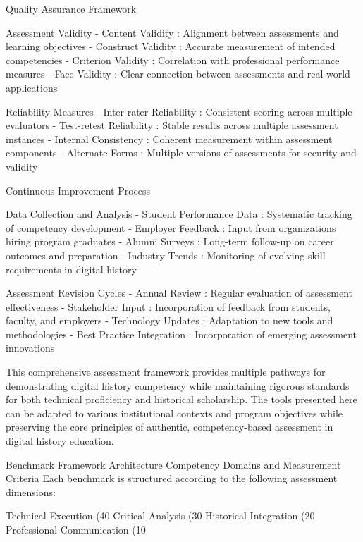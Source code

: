 \begin{appendices}
    Quality Assurance Framework

     Assessment Validity
-  Content Validity : Alignment between assessments and learning objectives
-  Construct Validity : Accurate measurement of intended competencies
-  Criterion Validity : Correlation with professional performance measures
-  Face Validity : Clear connection between assessments and real-world applications

     Reliability Measures
-  Inter-rater Reliability : Consistent scoring across multiple evaluators
-  Test-retest Reliability : Stable results across multiple assessment instances
-  Internal Consistency : Coherent measurement within assessment components
-  Alternate Forms : Multiple versions of assessments for security and validity

    Continuous Improvement Process

     Data Collection and Analysis
-  Student Performance Data : Systematic tracking of competency development
-  Employer Feedback : Input from organizations hiring program graduates
-  Alumni Surveys : Long-term follow-up on career outcomes and preparation
-  Industry Trends : Monitoring of evolving skill requirements in digital history

     Assessment Revision Cycles
-  Annual Review : Regular evaluation of assessment effectiveness
-  Stakeholder Input : Incorporation of feedback from students, faculty, and employers
-  Technology Updates : Adaptation to new tools and methodologies
-  Best Practice Integration : Incorporation of emerging assessment innovations

This comprehensive assessment framework provides multiple pathways for demonstrating digital history competency while maintaining rigorous standards for both technical proficiency and historical scholarship. The tools presented here can be adapted to various institutional contexts and program objectives while preserving the core principles of authentic, competency-based assessment in digital history education.

\label{compt_msrmnt}

Benchmark Framework Architecture
Competency Domains and Measurement Criteria
Each benchmark is structured according to the following assessment dimensions:

Technical Execution (40%
Critical Analysis (30%
Historical Integration (20%
Professional Communication (10%


\end{appendices}

